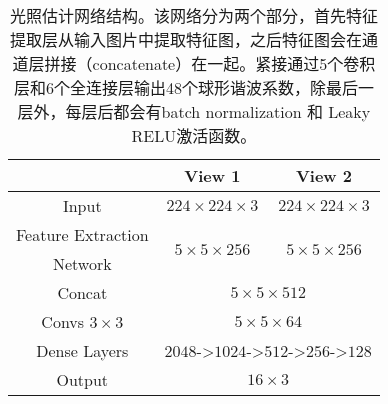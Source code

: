 \begin{table}[htbp]
    \centering
    \begin{tabular}{c|c|c} 
    \hline
    ~           &    View 1 & View 2    \\
    \hline
    Input       &   $224\times224\times3$  &    $224\times224\times3$ \\
    \hline
    Feature Extraction & \multirow{2}{*}{$5\times5\times256$} & \multirow{2}{*}{$5\times5\times256$}\\
    Network&~&~\\
    \hline
    Concat & \multicolumn{2}{c}{$5\times 5\times 512$}     \\
    \hline
    Convs $3\times3$     & \multicolumn{2}{c}{$5\times5\times64$}\\
    \hline
    Dense Layers          & \multicolumn{2}{c}{$2048$->$1024$->$512$->$256$->$128$}\\
    \hline
    Output      & \multicolumn{2}{c}{$16\times3$}\\
    \hline
    \end{tabular}
    \caption[光照估计网络结构]{\label{table:cnn}
        光照估计网络结构。该网络分为两个部分，首先特征提取层从输入图片中提取特征图，之后特征图会在通道层拼接（concatenate）在一起。紧接通过5个卷积层和6个全连接层输出48个球形谐波系数，除最后一层外，每层后都会有batch normalization 和 Leaky RELU激活函数。
    }
\end{table}